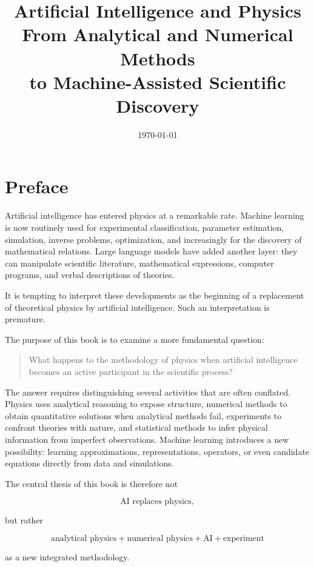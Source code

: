 \documentclass[11pt,a4paper,oneside]{book}
\title{
\Huge\bfseries
Artificial Intelligence and Physics\\[0.4cm]
\Large
From Analytical and Numerical Methods\\
to Machine-Assisted Scientific Discovery
}
\author{
}
\date{\today}
\begin{document}

\frontmatter

\maketitle

\chapter*{Preface}

Artificial intelligence has entered physics at a remarkable rate. Machine
learning is now routinely used for experimental classification, parameter
estimation, simulation, inverse problems, optimization, and increasingly for
the discovery of mathematical relations. Large language models have added
another layer: they can manipulate scientific literature, mathematical
expressions, computer programs, and verbal descriptions of theories.

It is tempting to interpret these developments as the beginning of a
replacement of theoretical physics by artificial intelligence. Such an
interpretation is premature.

The purpose of this book is to examine a more fundamental question:

\begin{quote}
What happens to the methodology of physics when artificial intelligence becomes
an active participant in the scientific process?
\end{quote}

The answer requires distinguishing several activities that are often conflated.
Physics uses analytical reasoning to expose structure, numerical methods to
obtain quantitative solutions when analytical methods fail, experiments to
confront theories with nature, and statistical methods to infer physical
information from imperfect observations. Machine learning introduces a new
possibility: learning approximations, representations, operators, or even
candidate equations directly from data and simulations.

The central thesis of this book is therefore not

\[
\text{AI replaces physics},
\]

but rather

\[
\boxed{
\text{analytical physics}
+
\text{numerical physics}
+
\text{AI}
+
\text{experiment}
}
\]

as a new integrated methodology.
\end{document}
